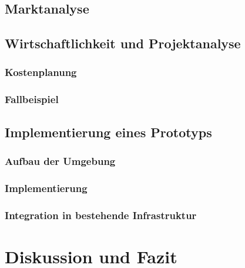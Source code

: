 \documentclass[a4paper, 12pt, oneside]{scrbook}
\begin{document}
	
	\section{Marktanalyse}
	
	
	\section{Wirtschaftlichkeit und Projektanalyse}
	
		\subsection{Kostenplanung}
		
		\subsection{Fallbeispiel}
	
	\section{Implementierung eines Prototyps}
	
		\subsection{Aufbau der Umgebung}
		
		\subsection{Implementierung}
		
			
		
		\subsection{Integration in bestehende Infrastruktur}
			

	
	
	\chapter{Diskussion und Fazit}
	
	
	
	
	\frontmatter
	\printbibliography
\end{document}
